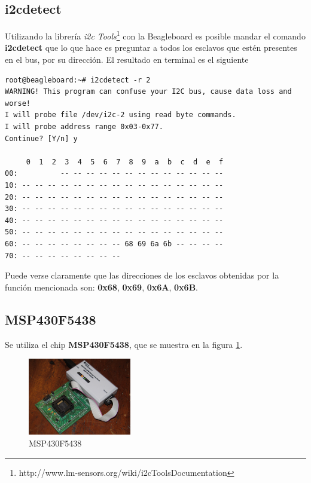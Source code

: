 \documentclass[main]{subfiles}
\begin{document}
\subsection*{i2cdetect}
Utilizando la librería \emph{i2c Tools}\footnote{http://www.lm-sensors.org/wiki/i2cToolsDocumentation} con la Beagleboard es posible mandar el comando \textbf{i2cdetect} que lo que hace es preguntar a todos los esclavos que estén presentes en el bus, por su dirección. El resultado en terminal es el siguiente
\begin{verbatim}
root@beagleboard:~# i2cdetect -r 2
WARNING! This program can confuse your I2C bus, cause data loss and worse!
I will probe file /dev/i2c-2 using read byte commands.
I will probe address range 0x03-0x77.
Continue? [Y/n] y

     0  1  2  3  4  5  6  7  8  9  a  b  c  d  e  f
00:          -- -- -- -- -- -- -- -- -- -- -- -- -- 
10: -- -- -- -- -- -- -- -- -- -- -- -- -- -- -- -- 
20: -- -- -- -- -- -- -- -- -- -- -- -- -- -- -- -- 
30: -- -- -- -- -- -- -- -- -- -- -- -- -- -- -- -- 
40: -- -- -- -- -- -- -- -- -- -- -- -- -- -- -- -- 
50: -- -- -- -- -- -- -- -- -- -- -- -- -- -- -- -- 
60: -- -- -- -- -- -- -- -- 68 69 6a 6b -- -- -- -- 
70: -- -- -- -- -- -- -- --
\end{verbatim}

Puede verse claramente que las direcciones de los esclavos obtenidas por la función mencionada son: \textbf{0x68}, \textbf{0x69}, \textbf{0x6A}, \textbf{0x6B}.

\subsection*{MSP430F5438}
\label{sec:MSP}
Se utiliza el chip \textbf{MSP430F5438}, que se muestra en la figura \ref{fig:MSP430F5438}.

\begin{figure}
	\begin{center}
	\includegraphics[width=0.4\textwidth]{./pics_sniffer/MSP430F5438.jpg}
	\end{center}
	\vspace{-20pt}
	\caption{MSP430F5438}
	\label{fig:MSP430F5438}
\end{figure}
\end{document}
